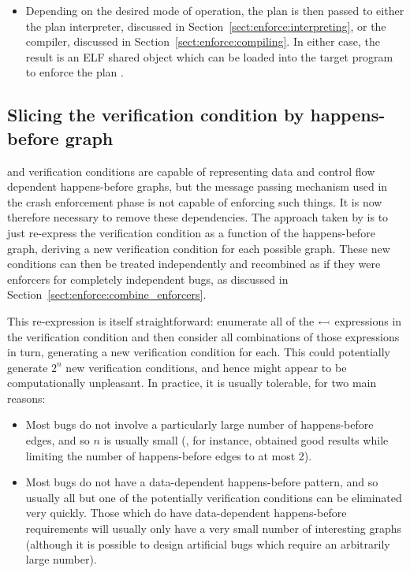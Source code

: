 \begin{itemize}
\item
  Depending on the desired mode of operation, the plan is then passed
  to either the plan interpreter, discussed in
  Section~\ref{sect:enforce:interpreting}, or the compiler, discussed
  in Section~\ref{sect:enforce:compiling}.  In either case, the result
  is an ELF shared object which can be loaded into the target program
  to enforce the plan .
\end{itemize}

\subsection{Slicing the verification condition by happens-before graph}
\label{sect:enforce:slice_hb_graph}


{\STateMachines} and verification conditions are capable of
representing data and control flow dependent happens-before graphs,
but the message passing mechanism used in the crash enforcement phase
is not capable of enforcing such things.  It is now therefore
necessary to remove these dependencies.  The approach taken by
{\implementation} is to just re-express the verification condition as
a function of the happens-before graph, deriving a new verification
condition for each possible graph.  These new conditions can then be
treated independently and recombined as if they were enforcers for
completely independent bugs, as discussed in
Section~\ref{sect:enforce:combine_enforcers}.

This re-expression is itself straightforward: enumerate all of the
$\leftarrowtail$ expressions in the verification condition and
then consider all combinations of those expressions in turn,
generating a new verification condition for each.  This could
potentially generate $2^n$ new verification conditions, and hence
might appear to be computationally unpleasant.  In practice, it is
usually tolerable, for two main reasons:

\begin{itemize}
\item
  Most bugs do not involve a particularly large number of
  happens-before edges, and so $n$ is usually small (, for instance, obtained good
  results while limiting the number of happens-before edges to at most
  2).
\item
  Most bugs do not have a data-dependent happens-before pattern, and
  so usually all but one of the potentially verification conditions
  can be eliminated very quickly.  Those which do have data-dependent
  happens-before requirements will usually only have a very small
  number of interesting graphs (although it is possible to design
  artificial bugs which require an arbitrarily large number).
\end{itemize}

